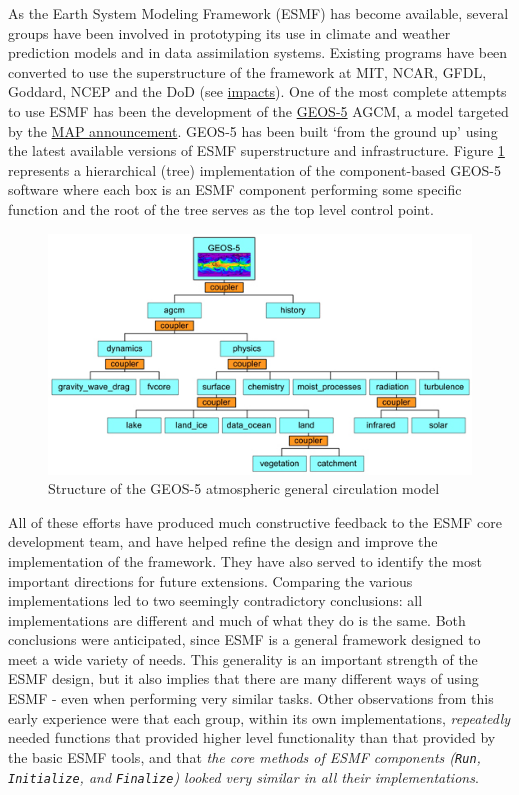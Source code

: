 As the Earth System Modeling Framework (ESMF)
has become available, several groups have been involved in prototyping
its use in climate and weather prediction models and in data
assimilation systems.  Existing programs have been converted to use
the superstructure of the framework at MIT, NCAR, GFDL, Goddard,
NCEP and the DoD (see 
\href{http://www.earthsystemmodeling.org/impacts/index.shtml}{impacts}).
One of the
most complete attempts to use ESMF has been the development of the
\href{http://geos5.org}{GEOS-5} AGCM, a model targeted by the
\href{http://map.nasa.gov}{MAP announcement}. GEOS-5 has been
built `from the ground up' using the latest available versions of ESMF
superstructure and infrastructure. Figure \ref{fig:geos5_esmf} represents a
hierarchical (tree) implementation of the component-based GEOS-5 software
where each box is an ESMF component performing some specific function and
the root of the tree serves as the top level control point.
%
\begin{figure}[h]
  \label{fig:geos5_esmf}
  \centering
  \includegraphics[scale=0.75]{figs/geos5_esmf.jpg}
  \caption{Structure of the GEOS-5 atmospheric general circulation model}
\end{figure}
%

All of these efforts have produced much constructive feedback to the
ESMF core development team, and have helped refine the design and
improve the implementation of the framework. They have also served to
identify the most important directions for future extensions.
Comparing the various implementations led to two seemingly
contradictory conclusions: all implementations are different and
much of what they do is the same.  Both conclusions were
anticipated, since ESMF is a general framework designed to meet a wide
variety of needs.  This generality is an important strength of the
ESMF design, but it also implies that there are many different ways of
using ESMF - even when performing very similar tasks. Other
observations from this early experience were that each group, within
its own implementations, \emph{repeatedly} needed functions that provided
higher level functionality than that provided by the basic ESMF tools,
and that \emph{the core methods of ESMF components ({\tt Run}, 
{\tt Initialize}, and {\tt Finalize}) looked very similar in all
their implementations}.

